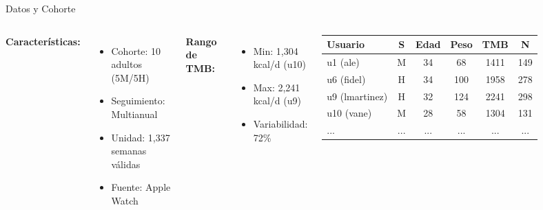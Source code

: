 \documentclass[aspectratio=169]{beamer}
\begin{document}
\begin{frame}{Datos y Cohorte}

\begin{columns}[T]
\textbf{Características:}
\begin{itemize}
    \item Cohorte: 10 adultos (5M/5H)
    \item Seguimiento: Multianual
    \item Unidad: 1,337 semanas válidas
    \item Fuente: Apple Watch
\end{itemize}

\vspace{0.3cm}

\textbf{Rango de TMB:}
\begin{itemize}
    \item Min: 1,304 kcal/d (u10)
    \item Max: 2,241 kcal/d (u9)
    \item Variabilidad: 72\%
\end{itemize}

\begin{table}
\centering
\small
\begin{tabular}{lccccc}
\toprule
\textbf{Usuario} & \textbf{S} & \textbf{Edad} & \textbf{Peso} & \textbf{TMB} & \textbf{N} \\
\midrule
u1 (ale) & M & 34 & 68 & 1411 & 149 \\
u6 (fidel) & H & 34 & 100 & 1958 & 278 \\
u9 (lmartinez) & H & 32 & 124 & 2241 & 298 \\
u10 (vane) & M & 28 & 58 & 1304 & 131 \\
\midrule
... & ... & ... & ... & ... & ... \\
\bottomrule
\end{tabular}
\end{table}
\end{columns}

\end{frame}

\end{document}
